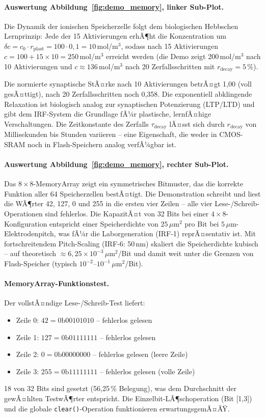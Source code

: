 ﻿\documentclass[a4paper,12pt]{scrreprt}
\theoremstyle{definition}
\begin{document}
\paragraph{Auswertung Abbildung~\ref{fig:demo_memory}, linker Sub-Plot.}
Die Dynamik der ionischen Speicherzelle folgt dem biologischen Hebbschen
Lernprinzip: Jede der 15 Aktivierungen erhÃ¶ht die Konzentration um
$\delta c = c_0 \cdot r_\text{plast} = 100 \cdot 0{,}1 = 10$\,mol/m$^3$,
sodass nach 15 Aktivierungen $c = 100 + 15 \times 10 = 250$\,mol/m$^3$ erreicht
werden (die Demo zeigt 200\,mol/m$^3$ nach 10 Aktivierungen und $c \approx 136$\,mol/m$^3$
nach 20 Zerfallsschritten mit $r_\text{decay} = 5$\,\%).

Die normierte synaptische StÃ¤rke nach 10 Aktivierungen betrÃ¤gt 1,00 (voll gesÃ¤ttigt),
nach 20 Zerfallsschritten noch 0,358. Die exponentiell abklingende Relaxation
ist biologisch analog zur synaptischen Potenzierung (LTP/LTD) und gibt dem
IRF-System die Grundlage fÃ¼r plastische, lernfÃ¤hige Verschaltungen. Die
Zeitkonstante des Zerfalls $\tau_\text{decay}$ lÃ¤sst sich durch $r_\text{decay}$
von Millisekunden bis Stunden variieren -- eine Eigenschaft, die weder in
CMOS-SRAM noch in Flash-Speichern analog verfÃ¼gbar ist.

\paragraph{Auswertung Abbildung~\ref{fig:demo_memory}, rechter Sub-Plot.}
Das $8 \times 8$-MemoryArray zeigt ein symmetrisches Bitmuster, das die korrekte
Funktion aller 64 Speicherzellen bestÃ¤tigt. Die Demonstration schreibt und liest
die WÃ¶rter 42, 127, 0 und 255 in die ersten vier Zeilen -- alle vier
Lese-/Schreib-Operationen sind fehlerlos. Die KapazitÃ¤t von 32 Bits bei einer
$4 \times 8$-Konfiguration entspricht einer Speicherdichte von $25\,\mu\text{m}^2$
pro Bit bei $5\,\mu\text{m}$-Elektrodenpitch, was fÃ¼r die Laborgeneration
(IRF-1) reprÃ¤sentativ ist. Mit fortschreitendem Pitch-Scaling (IRF-6: 50\,nm)
skaliert die Speicherdichte kubisch -- auf theoretisch $\approx 6{,}25 \times 10^{-3}\,\mu\text{m}^2$/Bit
und damit weit unter die Grenzen von Flash-Speicher (typisch $10^{-2}$--$10^{-1}\,\mu\text{m}^2$/Bit).

\paragraph{MemoryArray-Funktionstest.}
Der vollstÃ¤ndige Lese-/Schreib-Test liefert:
\begin{itemize}
	\item Zeile 0: $42 = 0\text{b}00101010$ -- fehlerlos gelesen
	\item Zeile 1: $127 = 0\text{b}01111111$ -- fehlerlos gelesen
	\item Zeile 2: $0 = 0\text{b}00000000$ -- fehlerlos gelesen (leere Zeile)
	\item Zeile 3: $255 = 0\text{b}11111111$ -- fehlerlos gelesen (volle Zeile)
\end{itemize}
18 von 32 Bits sind gesetzt (56,25\,\% Belegung), was dem Durchschnitt der
gewÃ¤hlten TestwÃ¶rter entspricht. Die Einzelbit-LÃ¶schoperation (Bit [1,3])
und die globale \texttt{clear()}-Operation funktionieren erwartungsgemÃ¤ÃŸ.
\end{document}
